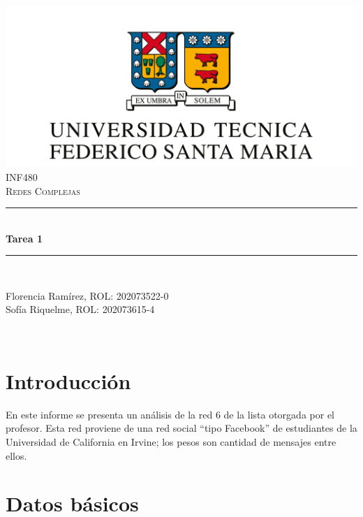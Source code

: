 \documentclass[12pt]{article}
\begin{document}
\begin{titlepage}
\newcommand{\HRule}{\rule{\linewidth}{0.5mm}} 
\center

\includegraphics[scale=0.4]{images/logo-usm.png}\\
\vspace{0.6cm}
\textsc{\large INF480}\\[0.5cm] %
\textsc{\Large Redes Complejas}\\[0.5cm] %

\HRule \\[0.4cm]
{ \huge \bfseries Tarea 1}\\[0.4cm] %
\HRule \\[1.5cm]
 
\begin{minipage}{0.8\textwidth}
\begin{center} \large
Florencia Ramírez, ROL: 202073522-0\\
Sofía Riquelme, ROL: 202073615-4
\end{center}

\end{minipage}\\[2cm]

\vfill %

\end{titlepage}

\section{Introducción}
En este informe se presenta un análisis de la red 6 de la lista otorgada por el profesor. Esta red proviene de una red social ``tipo Facebook'' de estudiantes de la Universidad de California en Irvine; los pesos son cantidad de mensajes entre ellos.

\section{Datos básicos}
\end{document}
